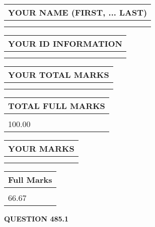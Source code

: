 \documentclass{ctexart}
\begin{document}
   
   
   
\newpage 
\setcounter{page}{ 
   485001 } 
   
   
   
   
\noindent\begin{tabular}{|l|}
\hline
YOUR NAME (FIRST, ... LAST)  \\
\hline
 \\ 
 \\ 
\hline
\end{tabular}
\hspace{0.05in} \begin{tabular}{|l|}
\hline
 YOUR   ID   INFORMATION  \\
\hline
 \\ 
 \\ 
\hline
\end{tabular}
   
   
\vspace{0.2in}\noindent\begin{tabular}{|l|}
\hline
YOUR TOTAL MARKS  \\
\hline
 \\ 
 \\ 
\hline
\end{tabular}
\hspace{0.05in} \begin{tabular}{|l|}
\hline
TOTAL FULL MARKS  \\
\hline
 \\ 
100.00 \\
\hline
\end{tabular}
   
   
 \vspace{0.2in}
 
 
 
 
   
   
  
\vspace{0.2in}
  
\noindent\begin{tabular}{|l|}
\hline
 YOUR MARKS  \\
\hline
 \\ 
 \\ 
\hline
\end{tabular}
\hspace{0.05in} \begin{tabular}{|l|}
\hline
 Full Marks  \\
\hline
 \\ 
66.67 \\
\hline
\end{tabular}
{\textbf{\Large{QUESTION
485.1 
}}}
  
\end{document}
